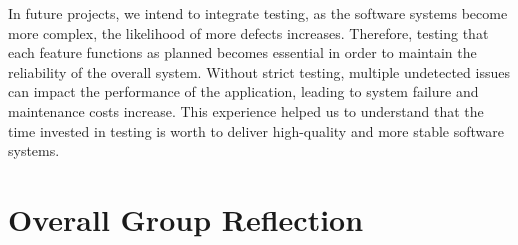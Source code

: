 In future projects, we intend to integrate testing, as the software systems become more complex, the likelihood of more defects increases. Therefore, testing that each feature functions as planned becomes essential in order to maintain the reliability of the overall system. Without strict testing, multiple undetected issues can impact the performance of the application, leading to system failure and maintenance costs increase. This experience helped us to understand that the time invested in testing is worth to deliver high-quality and more stable software systems.  


\section{Overall Group Reflection}

